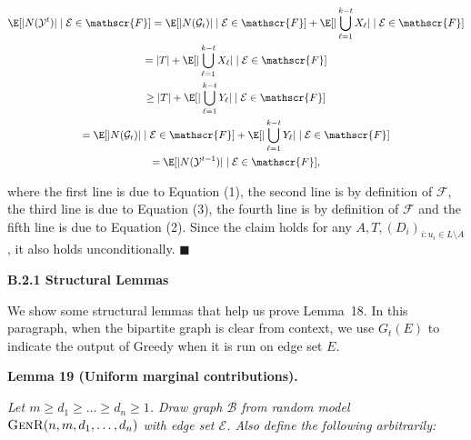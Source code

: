 \[\begin{gathered}
\displaystyle\E[|N(\mathcal{Y}^{t})|\mid\mathcal{E}\in\mathscr{F}] \displaystyle=\E[|N(\mathcal{G}_{t})|\mid\mathcal{E}\in\mathscr{F}]+\E[|\bigcup_{\ell=1}^{k-t}{X_{\ell}}|\mid\mathcal{E}\in\mathscr{F}] \\
\displaystyle=|T|+\E[|\bigcup_{\ell=1}^{k-t}{X_{\ell}}|\mid\mathcal{E}\in\mathscr{F}] \\
\displaystyle\geq|T|+\E[|\bigcup_{\ell=1}^{k-t}{Y_{\ell}}|\mid\mathcal{E}\in\mathscr{F}] \\
\displaystyle=\E[|N(\mathcal{G}_{t})|\mid\mathcal{E}\in\mathscr{F}]+\E[|\bigcup_{\ell=1}^{k-t}{Y_{\ell}}|\mid\mathcal{E}\in\mathscr{F}] \\
\displaystyle=\E[|N(\mathcal{Y}^{t-1})|\mid\mathcal{E}\in\mathscr{F}],
\end{gathered}\]


where the first line is due to Equation (1), the second line is by definition of $\mathscr{F}$, the third line is due to Equation (3), the fourth line is by definition of $\mathscr{F}$ and the fifth line is due to Equation (2).
Since the claim holds for any $A,T,(D_{i})_{i:u_{i}\in L\setminus A}$, it also holds unconditionally.
\ensuremath{\blacksquare}\par





\par\medskip\noindent\textbf{B.2.1 Structural Lemmas}\par




We show some structural lemmas that help us prove Lemma 18. In this paragraph, when the bipartite graph is clear from context, we use $G_{t}(E)$ to indicate the output of Greedy when it is run on edge set $E$.\par





\par\medskip\noindent\textbf{\textbf{Lemma 19}\textbf{ }(Uniform marginal contributions)\textbf{.}}\par



\emph{Let $m\geq d_{1}\geq\dots\geq d_{n}\geq 1$. Draw graph $\mathcal{B}$ from random model $\textsc{GenR}(n,m,d_{1},\dots,d_{n})$ with edge set $\mathcal{E}$.
Also define the following arbitrarily:}\par


